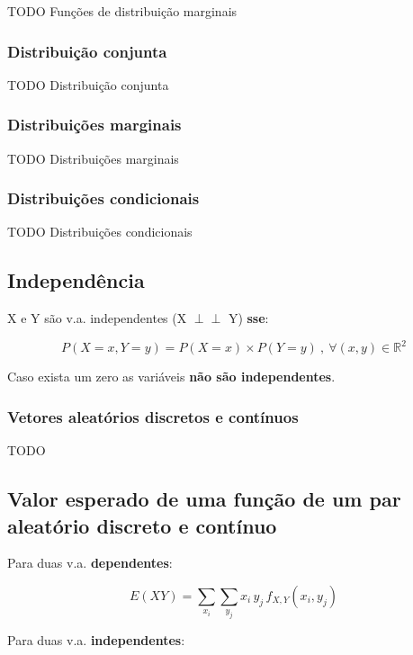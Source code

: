 \documentclass[11pt, a4paper]{article}
\newcommand\independent{\perp\!\!\!\!\!\!\perp}
\begin{document}
TODO Funções de distribuição marginais

\subsubsection*{Distribuição conjunta}

TODO Distribuição conjunta

\subsubsection*{Distribuições marginais}

TODO Distribuições marginais

\subsubsection*{Distribuições condicionais}

TODO Distribuições condicionais

\subsection{Independência}

X e Y são v.a. independentes (X $\independent$ Y) \textbf{sse}:

\begin{equation*}
    P(X = x, Y = y) = P(X = x) \times P(Y = y) \ , \
    \forall(x, y) \in \mathbb{R}^2
\end{equation*}

Caso exista um zero as variáveis \textbf{não são independentes}.

\subsubsection*{Vetores aleatórios discretos e contínuos}

TODO

\subsection*{Valor esperado de uma função de um par aleatório discreto e contínuo}

Para duas v.a. \textbf{dependentes}:

\begin{equation*}
    E(XY) = \sum_{x_i} \sum_{y_j} x_i \, y_j \, f_{X,Y}(x_i, y_j)
\end{equation*}

Para duas v.a. \textbf{independentes}:
\end{document}
